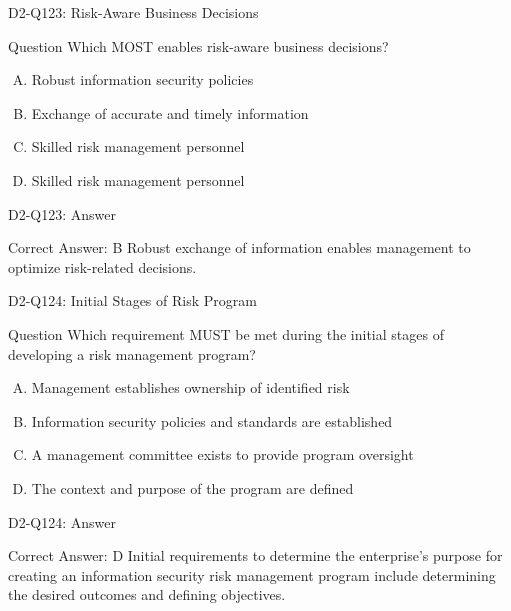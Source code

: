 \documentclass{beamer}
\begin{document}
	\begin{frame}{D2-Q123: Risk-Aware Business Decisions}
		\begin{block}{Question}
			Which MOST enables risk-aware business decisions?
		\end{block}
		\begin{enumerate}[(A)]
			\item Robust information security policies
			\item Exchange of accurate and timely information
			\item Skilled risk management personnel
			\item Skilled risk management personnel
		\end{enumerate}
	\end{frame}
	\begin{frame}{D2-Q123: Answer}
		\begin{block}{Correct Answer: B}
			Robust exchange of information enables management to optimize risk-related decisions.
		\end{block}
	\end{frame}
	
	\begin{frame}{D2-Q124: Initial Stages of Risk Program}
		\begin{block}{Question}
			Which requirement MUST be met during the initial stages of developing a risk management program?
		\end{block}
		\begin{enumerate}[(A)]
			\item Management establishes ownership of identified risk
			\item Information security policies and standards are established
			\item A management committee exists to provide program oversight
			\item The context and purpose of the program are defined
		\end{enumerate}
	\end{frame}
	\begin{frame}{D2-Q124: Answer}
		\begin{block}{Correct Answer: D}
			Initial requirements to determine the enterprise's purpose for creating an information security risk management program include determining the desired outcomes and defining objectives.
		\end{block}
	\end{frame}
	
\end{document}

